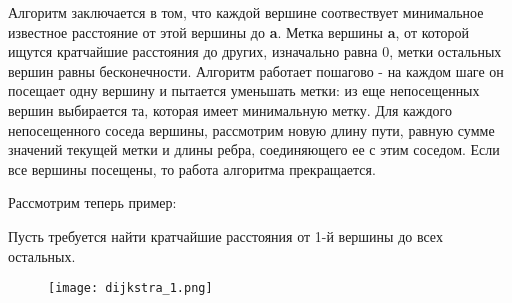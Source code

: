 Алгоритм заключается в том, что каждой вершине соотвествует минимальное известное расстояние от
этой вершины до \textbf{a}. Метка вершины \textbf{a}, от которой ищутся кратчайшие расстояния до других, изначально равна 0, метки
остальных вершин равны бесконечности. Алгоритм работает пошагово - на каждом шаге он посещает одну вершину
и пытается уменьшать метки: из еще непосещенных вершин выбирается та, которая имеет
минимальную метку. Для каждого непосещенного соседа вершины, рассмотрим новую длину пути,
равную сумме значений текущей метки и длины ребра, соединяющего ее с этим соседом.
Если все вершины посещены, то работа алгоритма прекращается.

Рассмотрим теперь пример:

Пусть требуется найти кратчайшие расстояния от 1-й вершины до всех остальных. 

\begin{figure}[!h]
    \centering 
    \texttt{[image: dijkstra\_1.png]}
\end{figure}
